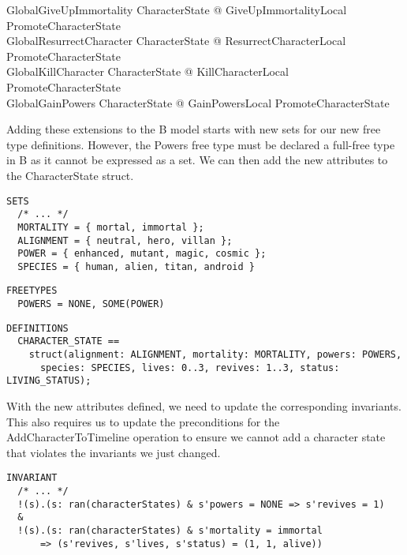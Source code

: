 \documentclass{article}
\begin{document}
\begin{zed}
GlobalGiveUpImmortality  \exists \Delta CharacterState @ GiveUpImmortalityLocal \land PromoteCharacterState \\
GlobalResurrectCharacter  \exists \Delta CharacterState @ ResurrectCharacterLocal \land PromoteCharacterState \\
GlobalKillCharacter  \exists \Delta CharacterState @ KillCharacterLocal \land PromoteCharacterState \\ 
GlobalGainPowers  \exists \Delta CharacterState @ GainPowersLocal \land PromoteCharacterState \\
\end{zed}

\hspace{-0.64cm} Adding these extensions to the B model starts with new sets for our new free type definitions. However, the Powers free type must be declared a full-free type in B as it cannot be expressed as a set. We can then add the new attributes to the CharacterState struct.

\begin{verbatim}
SETS 
  /* ... */
  MORTALITY = { mortal, immortal };
  ALIGNMENT = { neutral, hero, villan };
  POWER = { enhanced, mutant, magic, cosmic };
  SPECIES = { human, alien, titan, android }
\end{verbatim}
\begin{verbatim}
FREETYPES
  POWERS = NONE, SOME(POWER)
\end{verbatim}
\begin{verbatim}
DEFINITIONS
  CHARACTER_STATE == 
    struct(alignment: ALIGNMENT, mortality: MORTALITY, powers: POWERS, 
      species: SPECIES, lives: 0..3, revives: 1..3, status: LIVING_STATUS);
\end{verbatim}

\hspace{-0.64cm} With the new attributes defined, we need to update the corresponding invariants. This also requires us to update the preconditions for the AddCharacterToTimeline operation to ensure we cannot add a character state that violates the invariants we just changed.

\begin{verbatim}
INVARIANT
  /* ... */
  !(s).(s: ran(characterStates) & s'powers = NONE => s'revives = 1)
  &
  !(s).(s: ran(characterStates) & s'mortality = immortal 
      => (s'revives, s'lives, s'status) = (1, 1, alive))
\end{verbatim}
\end{document}
